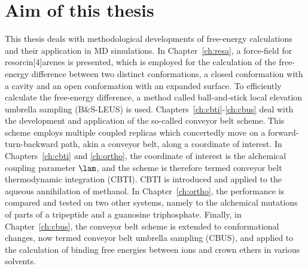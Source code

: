 \section{Aim of this thesis}

This thesis deals with methodological developments of free-energy calculations
and their application in MD simulations.
%
In Chapter~\ref{ch:resa}, a force-field for resorcin[4]arenes is presented,
which is employed for the calculation of the free-energy difference between two distinct conformations, a closed
\vase{} conformation with a cavity and an open \kite{} conformation with an expanded surface. To efficiently calculate the free-energy difference, a
method called ball-and-stick local elevation umbrella sampling (B\&S-LEUS) is used.
%
Chapters~\ref{ch:cbti}-\ref{ch:cbus} deal with the development and 
application of the so-called conveyor belt scheme. This scheme employs multiple
coupled replicas which concertedly move on a forward-turn-backward path, akin
a conveyor belt, along a coordinate of interest.
%
In Chapters~\ref{ch:cbti} and \ref{ch:ortho}, the coordinate of interest is the alchemical coupling parameter
 $\lam$, and the scheme is therefore termed conveyor belt thermodynamic integration (CBTI).
CBTI is introduced and applied to the aqueous annihilation of methanol. In Chapter~\ref{ch:ortho}, the performance is compared and
tested on two other systems, namely to the alchemical mutations of parts of a tripeptide and a guanosine triphosphate.
Finally, in Chapter~\ref{ch:cbus}, the conveyor belt scheme is extended to 
conformational changes, now termed conveyor belt umbrella sampling (CBUS),
and applied to the calculation of binding free energies between ions and crown ethers
in various solvents.

